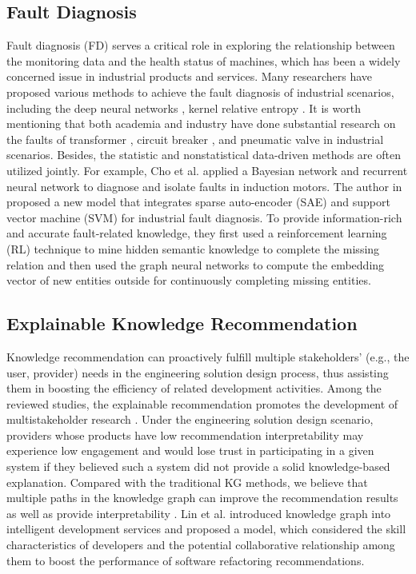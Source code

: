 \documentclass[11pt]{article}
\begin{document}
\subsection{Fault Diagnosis}
\par{Fault diagnosis (FD) serves a critical role in exploring the relationship between the monitoring data and the health status of machines, which has been a widely concerned issue in industrial products and services.
Many researchers have proposed various methods to achieve the fault diagnosis of industrial scenarios, including the deep neural networks \cite{bib34}, kernel relative entropy \cite{bib35}.
It is worth mentioning that both academia and industry have done substantial research on the faults of transformer \cite{bib36}, circuit breaker \cite{bib37}, and pneumatic valve \cite{bib38} in industrial scenarios.
Besides, the statistic and nonstatistical data-driven methods are often utilized jointly.
For example, Cho et al. \cite{bib39} applied a Bayesian network and recurrent neural network to diagnose and isolate faults in induction motors.
The author in \cite{bib40} proposed a new model that integrates sparse auto-encoder (SAE) and support vector machine (SVM) for industrial fault diagnosis.
To provide information-rich and accurate fault-related knowledge, they first used a reinforcement learning (RL) \cite{bibts} technique to mine hidden semantic knowledge to complete the missing relation and then used the graph neural networks \cite{bib41} to compute the embedding vector of new entities outside for continuously completing missing entities. }



\subsection{Explainable Knowledge Recommendation}
\par{Knowledge recommendation can proactively fulfill multiple stakeholders' (e.g., the user, provider) needs in the engineering solution design process, thus assisting them in boosting the efficiency of related development activities.
Among the reviewed studies, the explainable recommendation promotes the development of multistakeholder research \cite{bib43}.
Under the engineering solution design scenario, providers whose products have low recommendation interpretability may experience low engagement and would lose trust in participating in a given system if they believed such a system did not provide a solid knowledge-based explanation.
Compared with the traditional KG methods, we believe that multiple paths in the knowledge graph can improve the recommendation results as well as provide interpretability \cite{bib44}.
Lin et al. \cite{bib45} introduced knowledge graph into intelligent development services and proposed a model, which considered the skill characteristics of developers and the potential collaborative relationship among them to boost the performance of software refactoring recommendations.}
\end{document}
